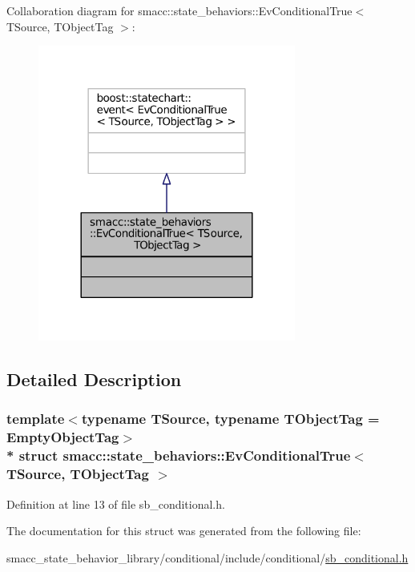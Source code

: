 Collaboration diagram for smacc\+:\+:state\+\_\+behaviors\+:\+:Ev\+Conditional\+True$<$ T\+Source, T\+Object\+Tag $>$\+:
\nopagebreak
\begin{figure}[H]
\begin{center}
\leavevmode
\includegraphics[width=240pt]{structsmacc_1_1state__behaviors_1_1EvConditionalTrue__coll__graph}
\end{center}
\end{figure}


\subsection{Detailed Description}
\subsubsection*{template$<$typename T\+Source, typename T\+Object\+Tag = Empty\+Object\+Tag$>$\\*
struct smacc\+::state\+\_\+behaviors\+::\+Ev\+Conditional\+True$<$ T\+Source, T\+Object\+Tag $>$}



Definition at line 13 of file sb\+\_\+conditional.\+h.



The documentation for this struct was generated from the following file\+:\begin{DoxyCompactItemize}
\item 
smacc\+\_\+state\+\_\+behavior\+\_\+library/conditional/include/conditional/\hyperlink{sb__conditional_8h}{sb\+\_\+conditional.\+h}\end{DoxyCompactItemize}

